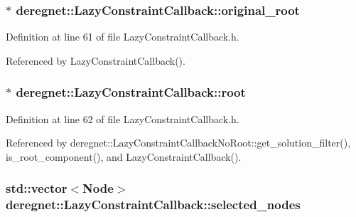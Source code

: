 \subsubsection[{\texorpdfstring{original\+\_\+root}{original_root}}]{$\ast$ deregnet\+::\+Lazy\+Constraint\+Callback\+::original\+\_\+root\hspace{0.3cm}{\ttfamily [protected]}}\hypertarget{classderegnet_1_1LazyConstraintCallback_a0ced82ab9f112cbb3e1df10a84be6c64}{}\label{classderegnet_1_1LazyConstraintCallback_a0ced82ab9f112cbb3e1df10a84be6c64}


Definition at line 61 of file Lazy\+Constraint\+Callback.\+h.



Referenced by Lazy\+Constraint\+Callback().

\subsubsection[{\texorpdfstring{root}{root}}]{$\ast$ deregnet\+::\+Lazy\+Constraint\+Callback\+::root\hspace{0.3cm}{\ttfamily [protected]}}\hypertarget{classderegnet_1_1LazyConstraintCallback_aa4df18debaaf3aaace54a48b0c3e56ca}{}\label{classderegnet_1_1LazyConstraintCallback_aa4df18debaaf3aaace54a48b0c3e56ca}


Definition at line 62 of file Lazy\+Constraint\+Callback.\+h.



Referenced by deregnet\+::\+Lazy\+Constraint\+Callback\+No\+Root\+::get\+\_\+solution\+\_\+filter(), is\+\_\+root\+\_\+component(), and Lazy\+Constraint\+Callback().

\subsubsection[{\texorpdfstring{selected\+\_\+nodes}{selected_nodes}}]{\setlength{\rightskip}{0pt plus 5cm}std\+::vector$<${\bf Node}$>$ deregnet\+::\+Lazy\+Constraint\+Callback\+::selected\+\_\+nodes\hspace{0.3cm}{\ttfamily [protected]}}\hypertarget{classderegnet_1_1LazyConstraintCallback_a5ddc4662e6e5c9f1d191c15edbefaa9b}{}\label{classderegnet_1_1LazyConstraintCallback_a5ddc4662e6e5c9f1d191c15edbefaa9b}


